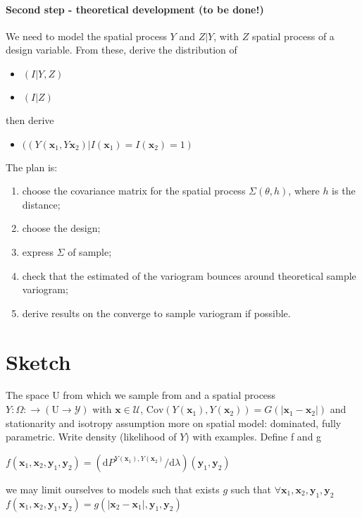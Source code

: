 \documentclass[12pt]{article}
\theoremstyle{definition}
\theoremstyle{remark}
\newcommand{\range}[1]{\mathscr{#1}}
\newcommand{\dominantY}{\lambda}
\newcommand{\Cov}{\mathrm{Cov}}
\newcommand{\Semivariogram}{G}
\newcommand{\Pop}{\mathrm{U}}
\newcommand{\position}{\mathbf{x}}
\newcommand{\Signal}{Y}
\newcommand{\signal}{\mathbf{y}}
\begin{document}
\paragraph{Second step - theoretical development (to be done!)}
We need to model the spatial process $Y$ and $Z|Y$, with $Z$ spatial process of a design variable. From these, derive the distribution of 
\begin{itemize}
    \item $(I|Y,Z)$
    \item $(I|Z)$
\end{itemize}
then derive
\begin{itemize}
    \item $((Y(\textbf{x}_{1},Y\textbf{x}_{2})|I(\textbf{x}_{1})=I(\textbf{x}_{2})=1)$
\end{itemize}

The plan is:
\begin{enumerate}
    \item choose the covariance matrix for the spatial process $\Sigma(\theta,h)$, where $h$ is the distance;
    \item choose the design;
    \item express $\Sigma$ of sample;
    \item check that the estimated of the variogram bounces around theoretical sample variogram;
    \item derive results on the converge to sample variogram if possible.
\end{enumerate}



\section{Sketch}
The space $\Pop$ from which we sample from and a spatial process $Y:\Omega:\to \left(\Pop\to\range{Y}\right)$ with $\position\in\range{U}$, $\Cov\left(\Signal(\position_{1}), \Signal(\position_{2})\right)=\Semivariogram\left(\left|\position_{1}-\position_{2}\right|\right)$ and stationarity and isotropy assumption {\color{red}more on spatial model: dominated, fully parametric. Write density (likelihood of $Y$) with examples. Define f and g}

 $f(\position_1,\position_2,\signal_1,\signal_2)=\left(\mathrm{d}P^{\Signal(\position_1),\Signal(\position_2)}/\mathrm{d}\dominantY\right)(\signal_1,\signal_2)$
    
    we may limit ourselves to models such that exists $g$ such that 
    $\forall \position_1,\position_2,\signal_1,\signal_2$    $f(\position_1,\position_2,\signal_1,\signal_2)=g(\left|\position_2-\position_1\right|,\signal_1,\signal_2)$
    
\end{document}
